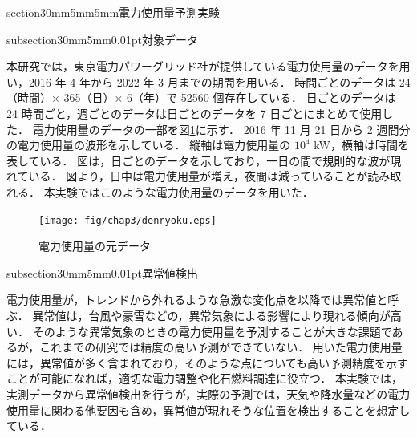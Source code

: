 \documentclass[twocolumn,fleqn,10pt]{jarticle}
\makeatletter
\renewcommand{\section}{\@startsection
{section}{3}{0mm}{5mm}{5mm}{\bfseries \normalsize}}
\renewcommand{\subsection}{\@startsection
{subsection}{3}{0mm}{5mm}{0.01pt}{\bfseries \normalsize}}
\makeatother
\begin{document}
\section{電力使用量予測実験}



\subsection{対象データ}

本研究では，東京電力パワーグリッド社が提供している電力使用量のデータを用い，2016 年 4 年から 2022 年 3 月までの期間を用いる．
時間ごとのデータは 24（時間）× 365（日）× 6（年）で 52560 個存在している．
日ごとのデータは 24 時間ごと，週ごとのデータは日ごとのデータを 7 日ごとにまとめて使用した．
電力使用量のデータの一部を図\ref{fig:denryoku}に示す．
2016 年 11 月 21 日から 2 週間分の電力使用量の波形を示している．
縦軸は電力使用量の $10^4$ kW，横軸は時間を表している．
図は，日ごとのデータを示しており，一日の間で規則的な波が現れている．
図より，日中は電力使用量が増え，夜間は減っていることが読み取れる．
本実験ではこのような電力使用量のデータを用いた．



\begin{figure}[b]
  \texttt{[image: fig/chap3/denryoku.eps]}
  \caption{電力使用量の元データ}
  \label{fig:denryoku}
\end{figure}












\subsection{異常値検出}

電力使用量が，トレンドから外れるような急激な変化点を以降では異常値と呼ぶ．
異常値は，台風や豪雪などの，異常気象による影響により現れる傾向が高い．
そのような異常気象のときの電力使用量を予測することが大きな課題であるが，これまでの研究では精度の高い予測ができていない．
用いた電力使用量には，異常値が多く含まれており，そのような点についても高い予測精度を示すことが可能になれば，適切な電力調整や化石燃料調達に役立つ．
本実験では，実測データから異常値検出を行うが，実際の予測では，天気や降水量などの電力使用量に関わる他要因も含め，異常値が現れそうな位置を検出することを想定している．
\end{document}
